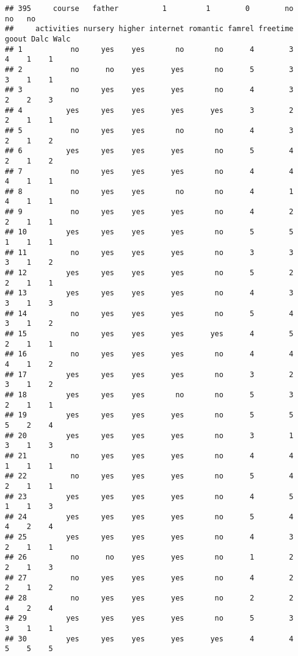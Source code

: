 \documentclass[
]{article}
\begin{document}
\begin{verbatim}
## 395     course   father          1         1        0        no     no   no
##     activities nursery higher internet romantic famrel freetime goout Dalc Walc
## 1           no     yes    yes       no       no      4        3     4    1    1
## 2           no      no    yes      yes       no      5        3     3    1    1
## 3           no     yes    yes      yes       no      4        3     2    2    3
## 4          yes     yes    yes      yes      yes      3        2     2    1    1
## 5           no     yes    yes       no       no      4        3     2    1    2
## 6          yes     yes    yes      yes       no      5        4     2    1    2
## 7           no     yes    yes      yes       no      4        4     4    1    1
## 8           no     yes    yes       no       no      4        1     4    1    1
## 9           no     yes    yes      yes       no      4        2     2    1    1
## 10         yes     yes    yes      yes       no      5        5     1    1    1
## 11          no     yes    yes      yes       no      3        3     3    1    2
## 12         yes     yes    yes      yes       no      5        2     2    1    1
## 13         yes     yes    yes      yes       no      4        3     3    1    3
## 14          no     yes    yes      yes       no      5        4     3    1    2
## 15          no     yes    yes      yes      yes      4        5     2    1    1
## 16          no     yes    yes      yes       no      4        4     4    1    2
## 17         yes     yes    yes      yes       no      3        2     3    1    2
## 18         yes     yes    yes       no       no      5        3     2    1    1
## 19         yes     yes    yes      yes       no      5        5     5    2    4
## 20         yes     yes    yes      yes       no      3        1     3    1    3
## 21          no     yes    yes      yes       no      4        4     1    1    1
## 22          no     yes    yes      yes       no      5        4     2    1    1
## 23         yes     yes    yes      yes       no      4        5     1    1    3
## 24         yes     yes    yes      yes       no      5        4     4    2    4
## 25         yes     yes    yes      yes       no      4        3     2    1    1
## 26          no      no    yes      yes       no      1        2     2    1    3
## 27          no     yes    yes      yes       no      4        2     2    1    2
## 28          no     yes    yes      yes       no      2        2     4    2    4
## 29         yes     yes    yes      yes       no      5        3     3    1    1
## 30         yes     yes    yes      yes      yes      4        4     5    5    5

\end{verbatim}
\end{document}
